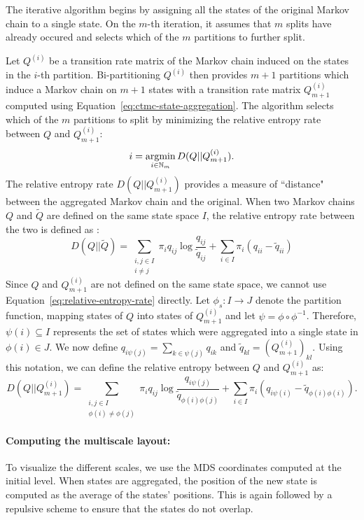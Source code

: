  The iterative algorithm begins by assigning  all the states of the original Markov chain to a single state. On the $m$-th iteration, it assumes that $m$ splits have already occured and selects which of the $m$ partitions to further split. 

 Let $Q^{(i)}$ be a transition rate matrix of the Markov chain induced on the states in the $i$-th partition. Bi-partitioning $Q^{(i)}$ then provides $m+1$ partitions which induce a Markov chain on $m+1$ states with a transition rate matrix $Q_{m+1}^{(i)}$ computed using Equation~\ref{eq:ctmc-state-aggregation}. The algorithm selects which of the $m$ partitions to split by minimizing the relative entropy rate between $Q$ and $Q_{m+1}^{(i)}$:
\begin{equation}
	i = \argmin\limits_{i \in \mathbb{N}_m} D(Q || Q_{m+1}^{(i)}).
\end{equation}
The relative entropy rate $D(Q || Q_{m+1}^{(i)})$ provides a measure of ``distance" between the aggregated Markov chain and the original. When two Markov chains $Q$ and $\tilde{Q}$ are defined on the same state space $I$, the relative entropy rate between the two is defined as \cite{EJP374}:
\begin{equation}
	\label{eq:relative-entropy-rate}
	D(Q || \tilde{Q}) = \sum\limits_{\substack{i,j \in I \\ i \neq j}}\pi_i q_{ij} \log\frac{q_{ij}}{\tilde{q}_{ij}} + \sum\limits_{i \in I}\pi_i(q_{ii} - \tilde{q}_{ii})
\end{equation}
Since $Q$ and $Q_{m+1}^{(i)}$ are not defined on the same state space, we cannot use Equation~\ref{eq:relative-entropy-rate} directly. Let $\phi_s: I \rightarrow J$ denote the partition function, mapping states of $Q$ into states of $Q_{m+1}^{(i)}$ and let $\psi = \phi \circ \phi^{-1}$. Therefore, $\psi(i) \subseteq I$  represents the set of states which were aggregated into a single state in $\phi(i) \in J$. We now define $q_{i\psi(j)} = \sum_{k \in \psi(j)}q_{ik}$ and $\tilde{q}_{kl} = \left(Q_{m+1}^{(i)}\right)_{kl}$. Using this notation, we can define the relative entropy between $Q$ and $Q_{m+1}^{(i)}$ as:
\begin{equation}
	D(Q || Q_{m+1}^{(i)}) = \sum\limits_{\substack{i,j \in I \\ \phi(i) \neq \phi(j)}}\pi_i q_{ij}\log\frac{q_{i\psi(j)}}{\tilde{q}_{\phi(i)\phi(j)}} + \sum\limits_{i \in I}\pi_i \left(q_{i\psi(i)} - \tilde{q}_{\phi(i)\phi(i)}\right).
\end{equation}

\paragraph{Computing the multiscale layout:}
To visualize the different scales, we use the MDS coordinates computed at the initial level. When states are aggregated, the position of the new state is computed as the  average of the states' positions. This is again followed by a repulsive scheme to ensure that the states do not overlap.